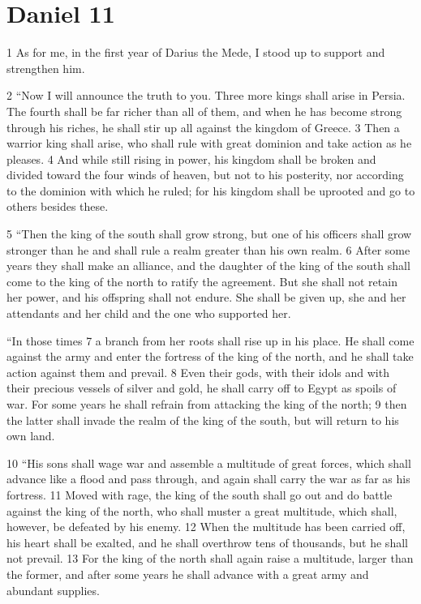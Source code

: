 \chapter{Daniel 11}
\label{ch:daniel11}

1 As for me, in the first year of Darius the Mede, I stood up to support and 
strengthen him.

2 ``Now I will announce the truth to you. Three more kings shall arise in Persia.
The fourth shall be far richer than all of them, and when he has become strong 
through his riches, he shall stir up all against the kingdom of Greece. 3 Then 
a warrior king shall arise, who shall rule with great dominion and take action 
as he pleases. 4 And while still rising in power, his kingdom shall be broken 
and divided toward the four winds of heaven, but not to his posterity, nor 
according to the dominion with which he ruled; for his kingdom shall be uprooted
and go to others besides these.

5 ``Then the king of the south shall grow strong, but one of his officers shall 
grow stronger than he and shall rule a realm greater than his own realm. 6 After 
some years they shall make an alliance, and the daughter of the king of the 
south shall come to the king of the north to ratify the agreement. But she shall 
not retain her power, and his offspring shall not endure. She shall be given up,
she and her attendants and her child and the one who supported her.

``In those times 7 a branch from her roots shall rise up in his place. He shall 
come against the army and enter the fortress of the king of the north, and he 
shall take action against them and prevail. 8 Even their gods, with their idols 
and with their precious vessels of silver and gold, he shall carry off to Egypt 
as spoils of war. For some years he shall refrain from attacking the king of 
the north; 9 then the latter shall invade the realm of the king of the south,
but will return to his own land.

10 ``His sons shall wage war and assemble a multitude of great forces, which 
shall advance like a flood and pass through, and again shall carry the war as 
far as his fortress. 11 Moved with rage, the king of the south shall go out and 
do battle against the king of the north, who shall muster a great multitude, 
which shall, however, be defeated by his enemy. 12 When the multitude has been 
carried off, his heart shall be exalted, and he shall overthrow tens of 
thousands, but he shall not prevail. 13 For the king of the north shall again 
raise a multitude, larger than the former, and after some years he shall advance 
with a great army and abundant supplies.

